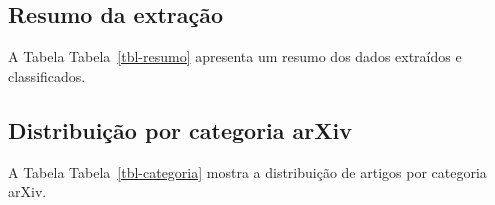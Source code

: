 \documentclass[
  brazilian,
  11pt,
  letterpaper,
  DIV=11,
  numbers=noendperiod]{scrartcl}
\begin{document}
\subsection{Resumo da extração}\label{resumo-da-extrauxe7uxe3o}

A Tabela Tabela~\ref{tbl-resumo} apresenta um resumo dos dados extraídos
e classificados.

\begin{table}

\caption{\label{tbl-resumo}Resumo da extração.}


\end{table}%

\subsection{Distribuição por categoria
arXiv}\label{distribuiuxe7uxe3o-por-categoria-arxiv}

A Tabela Tabela~\ref{tbl-categoria} mostra a distribuição de artigos por
categoria arXiv.
\end{document}
